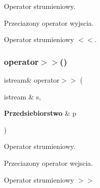 Operator strumieniowy. 

Przeciazony operator wyjscia.

Operator strumieniowy $<$$<$. \mbox{\label{_przedsiebiorstwo_8cpp_af9de6edea9cbaa7152816ed3251f934e}} 
\subsubsection{operator$>$$>$()}
{\footnotesize\ttfamily istream\& operator$>$$>$ (\begin{DoxyParamCaption}\item[{istream \&}]{s,  }\item[{\textbf{ Przedsiebiorstwo} \&}]{p }\end{DoxyParamCaption})}



Operator strumieniowy. 

Przeciazony operator wejscia.

Operator strumieniowy $>$$>$ 